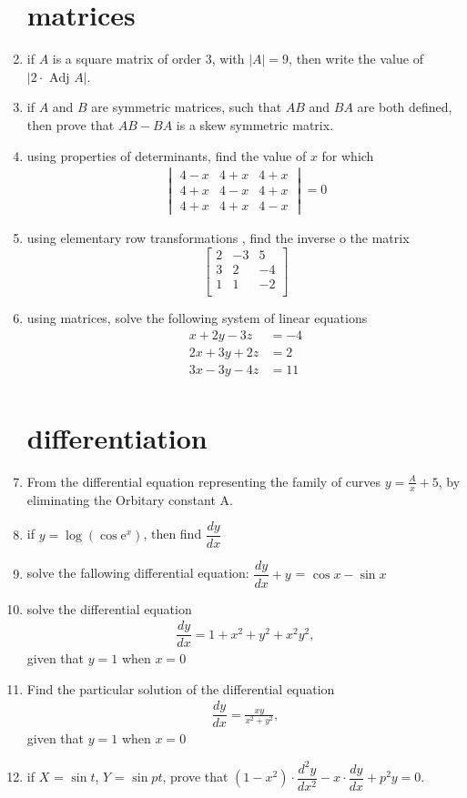 \documentclass[12pt,-letter paper]{article}
\providecommand{\mydet}[1]{\ensuremath{\begin{vmatrix}#1\end{vmatrix}}}
\providecommand{\abs}[1]{\left\vert#1\right\vert}
\begin{document}
\begin{enumerate}
 \section{matrices}
 \item if $A$ is a square matrix of order $3$, with $\abs{A}=9$, then write the value of $\abs{2\cdot\text{ Adj }A}$.
 \item if $A$ and $B$ are symmetric matrices, such that $AB$ and $BA$ are both defined, then prove that $AB-BA$ is a skew symmetric matrix.
 \item using properties of determinants, find the value of $x$ for which
	\begin{align*}
	\mydet{4-x & 4+x & 4+x\\4+x & 4-x & 4+x\\4+x & 4+x & 4-x}=0
        \end{align*}
 \item using elementary row transformations , find the inverse o the matrix 
	$$\begin{bmatrix}
		2 & -3 & 5 \\
		3 & 2 & -4 \\
		1 & 1 & -2 \\
	\end{bmatrix}$$

\item using matrices, solve the following system of linear equations 
 \begin {align*}
         x+2y-3z &= -4\\
	     2x+3y+2z &= 2\\
		 3x-3y-4z &= 11\\
   \end{align*}
 \section{differentiation}
 \item From the differential equation representing the family of curves $y=\frac{A}{x}+5$, by eliminating the Orbitary constant A.
 \item if $y=\log(\cos\text{e}^x)$, then find $\dfrac{dy}{dx}$
  \item solve the fallowing differential equation:
	$\dfrac{dy}{dx}+y$ = $\cos{x}-\sin{x}$
 \item solve the differential equation 
	\begin{align*}
	   \dfrac{dy}{dx} = 1+x^2+y^2+x^2y^2,
	\end{align*}
		given that $y=1$ when $x=0$
\item Find the particular solution of the differential equation
  \begin{align*}
	\dfrac{dy}{dx}=\frac{xy}{x^2+y^2},
  \end{align*}
  given that $y=1$ when $x=0$
  \item if $X$ = $\sin t $, $Y$ = $\sin pt$, prove that $(1-x^2)\cdot \dfrac{d^2y}{dx^2}-x\cdot\dfrac{dy}{dx}+p^2y=0$.


\end{enumerate}
\end{document}
